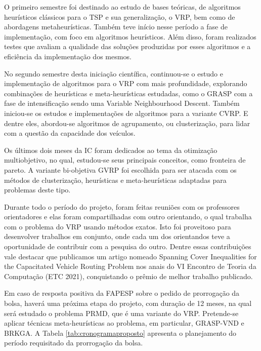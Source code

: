 \documentclass[12pt, a4paper]{article}
\begin{document}
O primeiro semestre foi destinado ao estudo de bases teóricas, de algoritmos heurísticos clássicos para o TSP e sua generalização, o VRP, bem como de abordagens metaheurísticas. Também teve início nesse período a fase de implementação, com foco em algoritmos heurísticos. Além disso, foram realizados testes que avaliam a qualidade das soluções produzidas por esses algoritmos e a eficiência da implementação dos mesmos.

No segundo semestre desta iniciação científica, continuou-se o estudo e implementação de algoritmos para o VRP com mais profundidade, explorando combinações de heurísticas e meta-heurísticas estudadas, como o GRASP com a fase de intensificação sendo uma Variable Neighbourhood Descent. Também iniciou-se os estudos e implementações de algoritmos para a variante CVRP. E dentre eles, abordou-se algoritmos de agrupamento, ou clusterização, para lidar com a questão da capacidade dos veículos.

Os últimos dois meses da IC foram dedicados ao tema da otimização multiobjetivo, no qual, estudou-se seus principais conceitos, como fronteira de pareto. A variante bi-objetiva GVRP foi escolhida para ser atacada com os métodos de clusterização, heurísticas e meta-heurísticas adaptadas para problemas deste tipo.

Durante todo o período do projeto, foram feitas reuniões com os professores orientadores e elas foram compartilhadas com outro orientando, o qual trabalha com o problema do VRP usando métodos exatos. Isto foi proveitoso para desenvolver trabalhos em conjunto, onde cada um dos orientandos teve a oportunidade de contribuir com a pesquisa do outro. Dentre essas contribuições vale destacar que publicamos um artigo nomeado Spanning Cover Inequalities for the Capacitated Vehicle Routing Problem \cite{arcencio2021spanning} nos anais do VI Encontro de Teoria da Computação (ETC 2021), conquistando o prêmio de melhor trabalho publicado.

Em caso de resposta positiva da FAPESP sobre o pedido de prorrogação da bolsa, haverá uma próxima etapa do projeto, com duração de 12 meses, na qual será estudado o problema PRMD, que é uma variante do VRP. Pretende-se aplicar técnicas meta-heurísticas ao problema, em particular, GRASP-VND e BRKGA. A Tabela \ref{tab:cronogramaproposto} apresenta o planejamento do período requisitado da prorrogação da bolsa.
\end{document}

